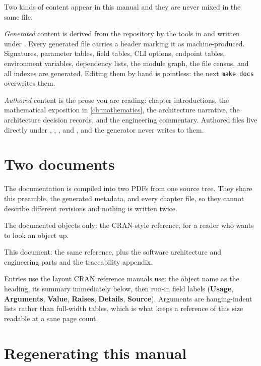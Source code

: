Two kinds of content appear in this manual and they are never mixed in the same
file.

\emph{Generated} content is derived from the repository by the tools in
 and written under . Every
generated file carries a header marking it as machine-produced. Signatures,
parameter tables, field tables, CLI options, endpoint tables, environment
variables, dependency lists, the module graph, the file census, and all indexes
are generated. Editing them by hand is pointless: the next \texttt{make docs}
overwrites them.

\emph{Authored} content is the prose you are reading: chapter introductions,
the mathematical exposition in \cref{ch:mathematics}, the architecture
narrative, the architecture decision records, and the engineering commentary.
Authored files live directly under ,
, , and
, and the generator never writes to them.

\section*{Two documents}

The documentation is compiled into two PDFs from one source tree. They share
this preamble, the generated metadata, and every chapter file, so they cannot
describe different revisions and nothing is written twice.

\begin{description}[nosep]
  \item[\srcfile{docs/latex/reference.tex}] The documented objects only: the
    CRAN-style reference, for a reader who wants to look an object up.
  \item[\srcfile{docs/latex/main.tex}] This document: the same reference, plus
    the software architecture and engineering parts and the traceability
    appendix.
\end{description}

Entries use the layout CRAN reference manuals use: the object name as the
heading, its summary immediately below, then run-in field labels
(\textbf{Usage}, \textbf{Arguments}, \textbf{Value}, \textbf{Raises},
\textbf{Details}, \textbf{Source}). Arguments are hanging-indent lists rather
than full-width tables, which is what keeps a reference of this size readable
at a sane page count.

\section*{Regenerating this manual}

